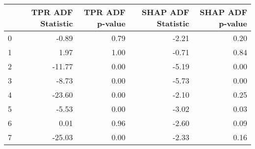 \begin{tabular}{lrrrr}
\toprule
 & TPR ADF Statistic & TPR ADF p-value & SHAP ADF Statistic & SHAP ADF p-value \\
\midrule
0 & -0.89 & 0.79 & -2.21 & 0.20 \\
1 & 1.97 & 1.00 & -0.71 & 0.84 \\
2 & -11.77 & 0.00 & -5.19 & 0.00 \\
3 & -8.73 & 0.00 & -5.73 & 0.00 \\
4 & -23.60 & 0.00 & -2.10 & 0.25 \\
5 & -5.53 & 0.00 & -3.02 & 0.03 \\
6 & 0.01 & 0.96 & -2.60 & 0.09 \\
7 & -25.03 & 0.00 & -2.33 & 0.16 \\
\bottomrule
\end{tabular}
